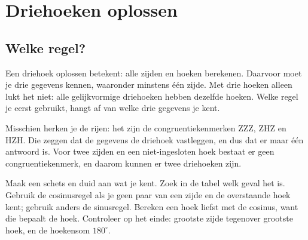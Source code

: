 \begin{oefeningen}
\end{oefeningen}

\section{Driehoeken oplossen}

\subsection{Welke regel?}

Een driehoek oplossen betekent: alle zijden en hoeken berekenen. Daarvoor moet je drie gegevens kennen, waaronder minstens één zijde. Met drie hoeken alleen lukt het niet: alle gelijkvormige driehoeken hebben dezelfde hoeken. Welke regel je eerst gebruikt, hangt af van welke drie gegevens je kent.


Misschien herken je de rijen: het zijn de congruentiekenmerken ZZZ, ZHZ en HZH. Die zeggen dat de gegevens de driehoek vastleggen, en dus dat er maar één antwoord is. Voor twee zijden en een niet-ingesloten hoek bestaat er geen congruentiekenmerk, en daarom kunnen er twee driehoeken zijn.

\begin{werkwijze}
Maak een schets en duid aan wat je kent. Zoek in de tabel welk geval het is. Gebruik de cosinusregel als je geen paar van een zijde en de overstaande hoek kent; gebruik anders de sinusregel. Bereken een hoek liefst met de cosinus, want die bepaalt de hoek. Controleer op het einde: grootste zijde tegenover grootste hoek, en de hoekensom $180^\circ$.
\end{werkwijze}

